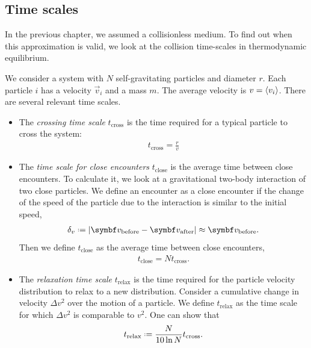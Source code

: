 \subsection{Time scales}
\label{ssec:time-scales}

In the previous chapter, we assumed a collisionless medium. To find out when this approximation is valid, we look at the collision time-scales in thermodynamic equilibrium.

We consider a system with $N$ self-gravitating particles and diameter $r$.
Each particle $i$ has a velocity $\vec{v}_i$ and a mass $m$. The average velocity is $v = \left\langle v_i \right\rangle$.
There are several relevant time scales.
\begin{itemize}
	\item The \emph{crossing time scale} $t_\text{cross}$ is the time required for a typical particle to cross the system:
	\begin{align*}
		t_\text{cross} = \frac{r}{v}
	\end{align*}

	\item The \emph{time scale for close encounters} $t_\text{close}$ is the average time between close encounters.
	To calculate it, we look at a gravitational two-body interaction of two close particles.
	We define an encounter as a close encounter if the change of the speed of the particle due to the interaction is similar to the initial speed,
	\begin{align*}
		\delta_v
		\defeq \abs*{\vec{v}_\text{before} - \vec{v}_\text{after}}
		\approx \vec{v}_\text{before}.
	\end{align*}
	Then we define $t_\text{close}$ as the average time between close encounters,
	\begin{align*}
		t_\text{close}
		= N t_\text{cross}.
	\end{align*}

	\item The \emph{relaxation time scale} $t_\text{relax}$ is the time required for the particle velocity distribution to relax to a new distribution.
	Consider a cumulative change in velocity $\Delta v^2$ over the motion of a particle.
	We define $t_\text{relax}$ as the time scale for which $\Delta v^2$ is comparable to $v^2$. One can show that
	\begin{align*}
		t_\text{relax}
		\defeq \frac{N}{10 \ln N} t_\text{cross}.
	\end{align*}
\end{itemize}


